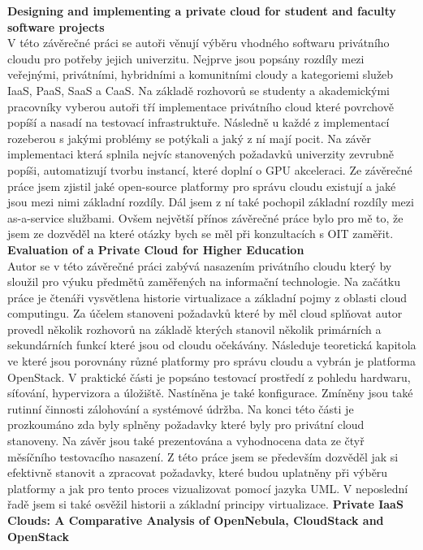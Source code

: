 \documentclass[twoside, 12pt]{article}
\begin{document}
\textbf{Designing and implementing a private cloud for student and faculty software projects}\\
V této závěrečné práci se autoři věnují výběru vhodného softwaru privátního cloudu pro potřeby jejich univerzitu. Nejprve jsou popsány rozdíly mezi veřejnými, privátními, hybridními a komunitními cloudy a kategoriemi služeb IaaS, PaaS, SaaS a CaaS. Na základě rozhovorů se studenty a akademickými pracovníky vyberou autoři tří implementace privátního cloud které povrchově popíší  a nasadí na testovací infrastruktuře. Následně u každé z implementací rozeberou s jakými problémy se potýkali a jaký z ní mají pocit. Na závěr implementaci která splnila nejvíc stanovených požadavků univerzity zevrubně popíši, automatizují tvorbu instancí, které doplní o GPU akceleraci. \cite{kth} Ze závěrečné práce jsem zjistil jaké open-source platformy pro správu cloudu existují a jaké jsou mezi nimi základní rozdíly. Dál jsem z ní také pochopil základní rozdíly mezi as-a-service službami. Ovšem největší přínos závěrečné práce bylo pro mě to, že jsem ze dozvěděl na které otázky bych se měl při konzultacích s OIT zaměřit.\\
\textbf{Evaluation of a Private Cloud for Higher Education} \\
Autor se v této závěrečné práci zabývá nasazením privátního cloudu který by sloužil pro výuku předmětů zaměřených na informační technologie. Na začátku práce je čtenáři vysvětlena historie virtualizace a základní pojmy z oblasti cloud computingu. Za účelem stanoveni požadavků které by měl cloud splňovat autor provedl několik rozhovorů na základě kterých stanovil několik primárních a sekundárních funkcí které jsou od cloudu očekávány. Následuje teoretická kapitola ve které jsou porovnány různé platformy pro správu cloudu a vybrán je platforma OpenStack. V praktické části je popsáno testovací prostředí z pohledu hardwaru, síťování, hypervizora a úložiště. Nastíněna je také konfigurace. Zmíněny jsou také rutinní činnosti zálohování a systémové údržba. Na konci této části je prozkoumáno zda byly splněny požadavky které byly pro privátní cloud stanoveny. Na závěr jsou také prezentována a vyhodnocena data ze čtyř měsíčního testovacího nasazení. \cite{trygve} Z této práce jsem se především dozvěděl jak si efektivně stanovit a zpracovat požadavky, které budou uplatněny při výběru platformy a jak pro tento proces vizualizovat pomocí jazyka UML. V neposlední řadě jsem si také osvěžil historii a základní principy virtualizace. 
\textbf{Private IaaS Clouds: A Comparative Analysis of OpenNebula, CloudStack and OpenStack}\\
\end{document}
